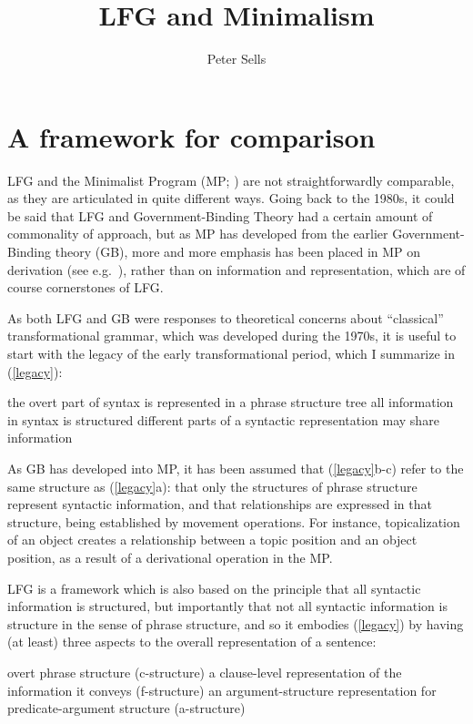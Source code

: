 \documentclass[output=paper,hidelinks]{langscibook}
\title{LFG and Minimalism}
\author{Peter Sells\affiliation{University of York}}
\begin{document}
\maketitle
\label{chap:Minimalism}

\section{A framework for comparison}
\label{sec:minimalism:framework}

LFG and the Minimalist Program (MP;
\citealp{chomsky1995the-minimalist,chomsky00}) are not
straightforwardly comparable, as they are articulated in quite
different ways. Going back to the 1980s, it could be said that LFG
and Government-Binding Theory \citep{chomsky1981lectures} had a
certain amount of commonality of approach, but as MP has developed
from the earlier Government-Binding theory (GB), more and more
emphasis has been placed in MP on derivation (see
e.g.~\citealp{hng06,hornstein18}), rather than on information and
representation, which are of course cornerstones of LFG.

As both LFG and GB were responses to theoretical concerns about
``classical'' transformational grammar, which was developed during the
1970s, it is useful to start with the legacy of the early
transformational period, which I summarize in (\ref{legacy}):

\ea\label{legacy}\ea
the overt part of syntax is represented in a phrase structure tree
\ex
all information in syntax is structured
\ex
different parts of a syntactic representation may share information
\z \z

As GB has developed into MP, it has been assumed that
(\ref{legacy}b-c) refer to the same structure as (\ref{legacy}a):
that only the structures of phrase structure represent syntactic
information, and that relationships are expressed in that structure,
being established by movement operations. For instance, topicalization
of an object creates a relationship between a topic position and an
object position, as a result of a derivational operation in the MP.

LFG is a framework which is also based on the principle that all
syntactic information is structured, but importantly that not all
syntactic information is structure in the sense of phrase structure,
and so it embodies (\ref{legacy}) by having (at least) three aspects
to the overall representation of a sentence:

\ea\label{3dims}\ea
overt phrase structure (c-structure)
\ex
a clause-level representation of the information it conveys
 (f-structure)
\ex
an argument-structure representation for predicate-argument structure
 (a-structure)
\z \z
\end{document}
